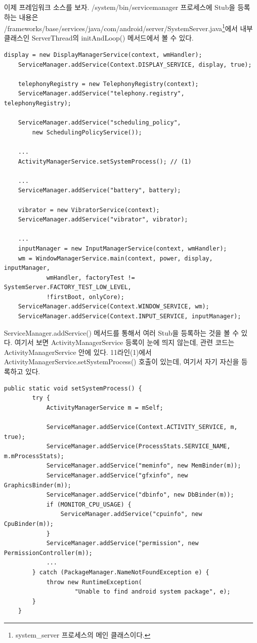 이제 프레임워크 소스를 보자.
/system/bin/servicemanager 프로세스에 Stub을 등록하는 내용은 /frameworks/base/services/java/com/android/server/SystemServer.java\footnote{system\_server 프로세스의 메인 클래스이다.}에서 내부 클래스인 ServerThread의 initAndLoop() 메서드에서 볼 수 있다.

\begin{lstlisting}[frame=single, caption=SystemServer.java] 
	display = new DisplayManagerService(context, wmHandler);
	ServiceManager.addService(Context.DISPLAY_SERVICE, display, true);
	
	telephonyRegistry = new TelephonyRegistry(context);
	ServiceManager.addService("telephony.registry", telephonyRegistry);
	
	ServiceManager.addService("scheduling_policy", 
		new SchedulingPolicyService());
		
	...
	ActivityManagerService.setSystemProcess(); // (1)
		
	...
	ServiceManager.addService("battery", battery);
	
	vibrator = new VibratorService(context);
	ServiceManager.addService("vibrator", vibrator);
	
	...
	inputManager = new InputManagerService(context, wmHandler);
	wm = WindowManagerService.main(context, power, display, inputManager,
	        wmHandler, factoryTest != SystemServer.FACTORY_TEST_LOW_LEVEL,
	        !firstBoot, onlyCore);
	ServiceManager.addService(Context.WINDOW_SERVICE, wm);
	ServiceManager.addService(Context.INPUT_SERVICE, inputManager);
\end{lstlisting}	    
ServiceManager.addService() 메서드를 통해서 여러 Stub을 등록하는 것을 볼 수 있다.
여기서 보면 ActivityManagerService 등록이 눈에 띄지 않는데, 관련 코드는 ActivityManagerService 안에 있다. 
11라인(1)에서 ActivityManagerService.setSystemProcess() 호출이 있는데, 여기서 자기 자신을 등록하고 있다.\\
\begin{lstlisting}[frame=single, caption=ActivityManagerService.java] 
   public static void setSystemProcess() {
        try {
            ActivityManagerService m = mSelf;

            ServiceManager.addService(Context.ACTIVITY_SERVICE, m, true);
            ServiceManager.addService(ProcessStats.SERVICE_NAME, m.mProcessStats);
            ServiceManager.addService("meminfo", new MemBinder(m));
            ServiceManager.addService("gfxinfo", new GraphicsBinder(m));
            ServiceManager.addService("dbinfo", new DbBinder(m));
            if (MONITOR_CPU_USAGE) {
                ServiceManager.addService("cpuinfo", new CpuBinder(m));
            }
            ServiceManager.addService("permission", new PermissionController(m));
 			...
        } catch (PackageManager.NameNotFoundException e) {
            throw new RuntimeException(
                    "Unable to find android system package", e);
        }
    }
\end{lstlisting}	    


